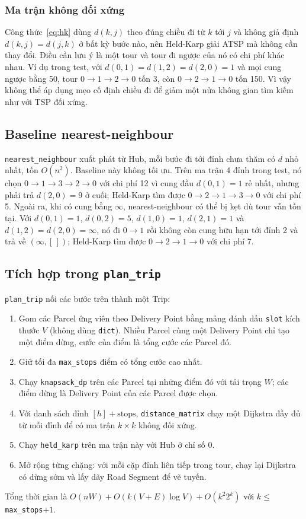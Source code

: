\subsubsection{Ma trận không đối xứng}
Công thức~\eqref{eq:hk} dùng $d(k, j)$ theo đúng chiều đi từ $k$ tới $j$ và không giả định $d(k,j) = d(j,k)$ ở bất kỳ bước nào, nên Held-Karp giải ATSP mà không cần thay đổi. Điều cần lưu ý là một tour và tour đi ngược của nó có chi phí khác nhau. Ví dụ trong test, với $d(0,1) = d(1,2) = d(2,0) = 1$ và mọi cung ngược bằng 50, tour $0 \to 1 \to 2 \to 0$ tốn 3, còn $0 \to 2 \to 1 \to 0$ tốn 150. Vì vậy không thể áp dụng mẹo cố định chiều đi để giảm một nửa không gian tìm kiếm như với TSP đối xứng.

\subsection{Baseline nearest-neighbour}

\texttt{nearest\_neighbour} xuất phát từ Hub, mỗi bước đi tới đỉnh chưa thăm có $d$ nhỏ nhất, tốn $O(n^2)$. Baseline này không tối ưu. Trên ma trận 4 đỉnh trong test, nó chọn $0 \to 1 \to 3 \to 2 \to 0$ với chi phí 12 vì cung đầu $d(0,1) = 1$ rẻ nhất, nhưng phải trả $d(2,0) = 9$ ở cuối; Held-Karp tìm được $0 \to 2 \to 1 \to 3 \to 0$ với chi phí 5. Ngoài ra, khi có cung bằng $\infty$, nearest-neighbour có thể bị kẹt dù tour vẫn tồn tại. Với $d(0,1) = 1$, $d(0,2) = 5$, $d(1,0) = 1$, $d(2,1) = 1$ và $d(1,2) = d(2,0) = \infty$, nó đi $0 \to 1$ rồi không còn cung hữu hạn tới đỉnh 2 và trả về $(\infty, [\,])$; Held-Karp tìm được $0 \to 2 \to 1 \to 0$ với chi phí 7.

\subsection{Tích hợp trong \texttt{plan\_trip}}

\texttt{plan\_trip} nối các bước trên thành một Trip:
\begin{enumerate}
\item Gom các Parcel ứng viên theo Delivery Point bằng mảng đánh dấu \texttt{slot} kích thước $V$ (không dùng \texttt{dict}). Nhiều Parcel cùng một Delivery Point chỉ tạo một điểm dừng, cước của điểm là tổng cước các Parcel đó.
\item Giữ tối đa \texttt{max\_stops} điểm có tổng cước cao nhất.
\item Chạy \texttt{knapsack\_dp} trên các Parcel tại những điểm đó với tải trọng $W$; các điểm dừng là Delivery Point của các Parcel được chọn.
\item Với danh sách đỉnh $[h] + \text{stops}$, \texttt{distance\_matrix} chạy một Dijkstra đầy đủ từ mỗi đỉnh để có ma trận $k \times k$ không đối xứng.
\item Chạy \texttt{held\_karp} trên ma trận này với Hub ở chỉ số 0.
\item Mở rộng từng chặng: với mỗi cặp đỉnh liên tiếp trong tour, chạy lại Dijkstra có dừng sớm và lấy dãy Road Segment để vẽ tuyến.
\end{enumerate}
Tổng thời gian là $O(nW) + O(k (V+E) \log V) + O(k^2 2^k)$ với $k \le$ \texttt{max\_stops}$+1$.

